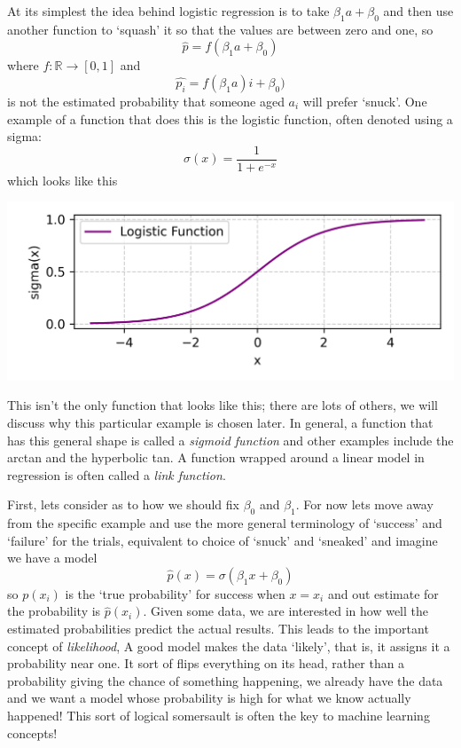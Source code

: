 \documentclass[12pt]{article}
\begin{document}
At its simplest the idea behind logistic regression is to take
$\beta_1a+\beta_0$ and then use another function to `squash' it so
that the values are between zero and one, so
\begin{equation}
\hat{p}=f(\beta_1 a+\beta_0)
\end{equation}
where $f:\mathbb{R}\rightarrow[0,1]$ and
\begin{equation}
\hat{p_i}=f(\beta_1 a)i+\beta_0)
\end{equation}
is not the estimated probability that someone aged $a_i$ will prefer
`snuck'. One example of a function that does this is the logistic
function, often denoted using a sigma:
\begin{equation}
  \sigma(x)=\frac{1}{1+e^{-x}}
\end{equation}
which looks like this
\begin{center}
  \includegraphics[]{02.4_logistic.png}
\end{center}
This isn't the only function that looks like this; there are lots of
others, we will discuss why this particular example is chosen
later. In general, a function that has this general shape is called a
\textsl{sigmoid function} and other examples include the arctan and
the hyperbolic tan. A function wrapped around a linear model in
regression is often called a \textsl{link function}.

First, lets consider as to how we should fix $\beta_0$ and
$\beta_1$. For now lets move away from the specific example and use
the more general terminology of `success' and `failure' for the
trials, equivalent to choice of `snuck' and `sneaked' and imagine we
have a model
\begin{equation}
\hat{p}(x)=\sigma(\beta_1 x+\beta_0)
\end{equation}
so $p(x_i)$ is the `true probability' for success when $x=x_i$ and out
estimate for the probability is $\hat{p}(x_i)$.  Given some data, we
are interested in how well the estimated probabilities predict the
actual results. This leads to the important concept of
\textsl{likelihood}, A good model makes the data `likely', that is, it
assigns it a probability near one. It sort of flips everything on its
head, rather than a probability giving the chance of something
happening, we already have the data and we want a model whose
probability is high for what we know actually happened! This sort of
logical somersault is often the key to machine learning concepts!
\end{document}
